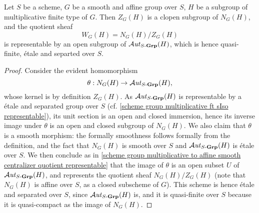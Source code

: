 \begin{proposition}\label{scheme group affine smooth Weyl group representable}
Let $S$ be a scheme, $G$ be a smooth and affine group over $S$, $H$ be a subgroup of multiplicative finite type of $G$. Then $Z_G(H)$ is a clopen subgroup of $N_G(H)$, and the quotient sheaf
\[W_G(H)=N_G(H)/Z_G(H)\]
is representable by an open subgroup of $\operatorname{\mathcal{A}\hspace*{-0.2pt}\textit{ut}\hspace{0.5pt}}_{S\textup{-}\mathbf{Grp}}(H)$, which is hence quasi-finite, \'etale and separted over $S$.
\end{proposition}
\begin{proof}
Consider the evident homomorphism
\[\theta:N_G(H)\to\operatorname{\mathcal{A}\hspace*{-0.2pt}\textit{ut}\hspace{0.5pt}}_{S\textup{-}\mathbf{Grp}}(H),\]
whose kernel is by definition $Z_G(H)$. As $\operatorname{\mathcal{A}\hspace*{-0.2pt}\textit{ut}\hspace{0.5pt}}_{S\textup{-}\mathbf{Grp}}(H)$ is representable by a \'etale and separated group over $S$ (cf. \cref{scheme group multiplicative ft sIso representable}), its unit section is an open and closed immersion, hence its inverse image under $\theta$ is an open and closed subgroup of $N_G(H)$. We also claim that $\theta$ is a smooth morphism: the formally smoothness follows formally from the definition, and the fact that $N_G(H)$ is smooth over $S$ and $\operatorname{\mathcal{A}\hspace*{-0.2pt}\textit{ut}\hspace{0.5pt}}_{S\textup{-}\mathbf{Grp}}(H)$ is \'etale over $S$. We then conclude as in \cref{scheme group multiplicative to affine smooth centralizer quotient representable} that the image of $\theta$ is an open subset $U$ of $\operatorname{\mathcal{A}\hspace*{-0.2pt}\textit{ut}\hspace{0.5pt}}_{S\textup{-}\mathbf{Grp}}(H)$, and represents the quotient sheaf $N_G(H)/Z_G(H)$ (note that $N_G(H)$ is affine over $S$, as a closed subscheme of $G$). This scheme is hence \'etale and separated over $S$, since $\operatorname{\mathcal{A}\hspace*{-0.2pt}\textit{ut}\hspace{0.5pt}}_{S\textup{-}\mathbf{Grp}}(H)$ is, and it is quasi-finite over $S$ because it is quasi-compact as the image of $N_G(H)$.
\end{proof}

